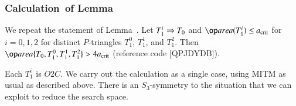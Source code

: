 \subsubsection{Calculation~of Lemma~} \label{sec:pent4}

We repeat the statement of Lemma~.  Let $T_1^i\Rightarrow T_0$
and $\area(T_1^i)\le\acrit$ for $i=0,1,2$ for distinct $P$-triangles
$T_1^0$, $T_1^1$, and $T_1^2$.  Then $\area\{T_0,T_1^0,T_1^1,T_1^2\} >
4\acrit$ (reference code [QPJDYDB]).

Each $T_1^i$ is $O2C$.  We carry out the calculation as a single case,
using MITM as usual as described above.  There is an $S_3$-symmetry to
the situation that we can exploit to reduce the search space.

